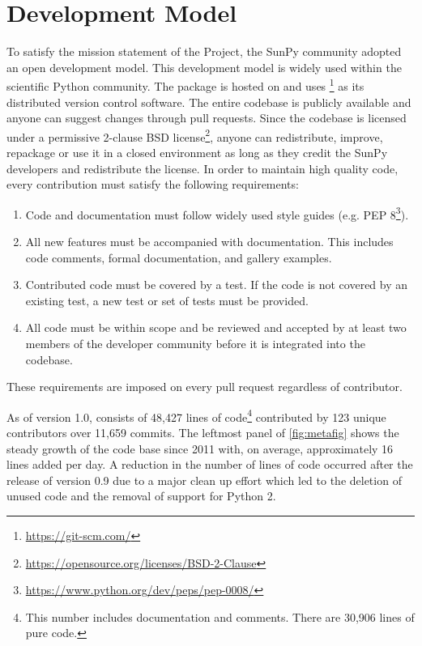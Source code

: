 \section{Development Model}
\label{sec:development}

To satisfy the mission statement of the Project, the SunPy community adopted an open development model.
This development model is widely used within the scientific Python community.
The \sunpypkg package is hosted on \github and uses \footnote{\url{https://git-scm.com/}} as its distributed version control software.
The entire codebase is publicly available and anyone can suggest changes through pull requests.
Since the codebase is licensed under a permissive 2-clause BSD license\footnote{\url{https://opensource.org/licenses/BSD-2-Clause}}, anyone can redistribute, improve, repackage or use it in a closed environment as long as they credit the SunPy developers and redistribute the license.
In order to maintain high quality code, every contribution must satisfy the following requirements:
\begin{enumerate}
    \item Code and documentation must follow widely used style guides (e.g. PEP 8\footnote{\url{https://www.python.org/dev/peps/pep-0008/}}).
    \item All new features must be accompanied with documentation.
    This includes code comments, formal documentation, and gallery examples.
    \item Contributed code must be covered by a test. If the code is not covered by an existing test, a new test or set of tests must be provided.
    \item All code must be within scope and be reviewed and accepted by at least two members of the developer community before it is integrated into the codebase.
\end{enumerate}
These requirements are imposed on every pull request regardless of contributor.

As of version 1.0, \sunpypkg consists of 48,427 lines of code\footnote{This number includes documentation and comments.
There are 30,906 lines of pure code.} contributed by 123 unique contributors over 11,659 \git commits.
The leftmost panel of \autoref{fig:metafig} shows the steady growth of the code base since 2011 with, on average, approximately 16 lines added per day.
A reduction in the number of lines of code occurred after the release of version 0.9 due to a major clean up effort which led to the deletion of unused code and the removal of support for Python 2.

